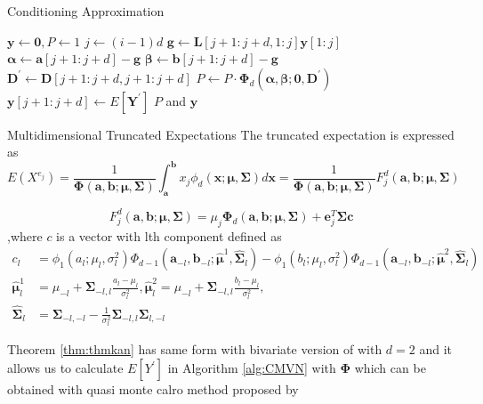 \begin{frame}{Conditioning Approximation}
\begin{algorithm}[H]
	\caption{d-dimensional conditioning algorithm}
	\begin{algorithmic}[1]
		\footnotesize
		\State $\mathbf{y}\leftarrow\mathbf{0},P\leftarrow1$
		\State $j\leftarrow(i-1)d$
		\State $\mathbf{g}\leftarrow\mathbf{L}[j+1:j+d,1:j]\mathbf{y}[1:j]$
		\State $\boldsymbol{\alpha}\leftarrow\mathbf{a}[j+1:j+d]-\mathbf{g}$
		\State $\boldsymbol{\beta}\leftarrow\mathbf{b}[j+1:j+d]-\mathbf{g}$
		\State $\mathbf{D}^\prime\leftarrow\mathbf{D}[j+1:j+d,j+1:j+d]$
		\State $P\leftarrow P\cdot\boldsymbol{\Phi}_d(\boldsymbol{\alpha},\boldsymbol{\beta};\mathbf{0},\mathbf{D}^\prime)$
		\State $\mathbf{y}[j+1:j+d]\leftarrow E[\mathbf{Y}^\prime]$
		\EndFor
		\State\Return $P$ and $\mathbf{y}$
		\EndProcedure
	\end{algorithmic}\label{alg:CMVN}
\end{algorithm}
\end{frame}

\begin{frame}{Multidimensional Truncated Expectations}
\footnotesize
The truncated expectation is expressed as
$$E(X^{e_j})=\frac{1}{\boldsymbol{\Phi}(\mathbf{a},\mathbf{b};\boldsymbol{\mu},\boldsymbol{\Sigma})}\int_\mathbf{a}^\mathbf{b}x_j\phi_d(\mathbf{x};\boldsymbol{\mu},\boldsymbol{\Sigma})d\mathbf{x}=\frac{1}{\boldsymbol{\Phi}(\mathbf{a},\mathbf{b};\boldsymbol{\mu},\boldsymbol{\Sigma})}F_j^d(\mathbf{a},\mathbf{b};\boldsymbol{\mu},\boldsymbol{\Sigma})$$

\begin{theorem}\citep{kan2017moments}
	\label{thm:thmkan}
	$$F_j^d(\mathbf{a},\mathbf{b};\boldsymbol{\mu},\boldsymbol{\Sigma})= \mu_j\boldsymbol{\Phi}_d(\mathbf{a},\mathbf{b};\boldsymbol{\mu},\boldsymbol{\Sigma})+\mathbf{e}_j^T\boldsymbol{\Sigma}\mathbf{c}$$
	,where $c$ is a vector with lth component defined as
	$$\begin{aligned}
	c_l&=\phi_1(a_l;\mu_l,\sigma_l^2)\Phi_{d-1}(\mathbf{a}_{-l},\mathbf{b}_{-l};\boldsymbol{\hat{\mu}}^1, \hat{\boldsymbol{\Sigma}}_l)
	-\phi_1(b_l;\mu_l,\sigma_l^2)\Phi_{d-1}(\mathbf{a}_{-l},\mathbf{b}_{-l};\boldsymbol{\hat{\mu}}^2, \hat{\boldsymbol{\Sigma}}_l)\\
	\boldsymbol{\hat{\mu}}^1_l&=\mu_{-l}+\boldsymbol{\Sigma}_{-l,l}\frac{a_l-\mu_l}{\sigma_l^2},
	\boldsymbol{\hat{\mu}}^2_l=\mu_{-l}+\boldsymbol{\Sigma}_{-l,l}\frac{b_l-\mu_l}{\sigma_l^2},\\
	\hat{\boldsymbol{\Sigma}}_l&=\boldsymbol{\Sigma}_{-l,-l} -\frac{1}{\sigma_l^2}\boldsymbol{\Sigma}_{-l,l}\boldsymbol{\Sigma}_{l,-l}
	\end{aligned}$$
\end{theorem}
Theorem \ref{thm:thmkan} has same form with bivariate version of \citet{trinh2015bivariate} with $d=2$ and it allows us to calculate $E[Y^\prime]$ in Algorithm \ref{alg:CMVN} with $\boldsymbol{\Phi}$ which can be obtained with quasi monte calro method proposed by \citet{genz1992numerical}
\end{frame}

